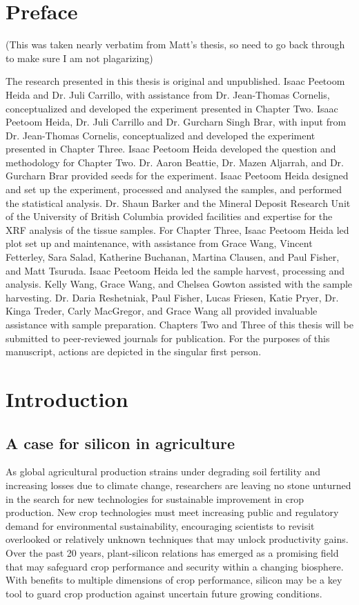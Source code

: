 \documentclass[12pt, letterpaper, ]{article}
\begin{document}
\section{Preface}

(This was taken nearly verbatim from Matt's thesis, so need to go back through to make sure I am not plagarizing)

The research presented in this thesis is original and unpublished. Isaac Peetoom Heida and Dr. Juli Carrillo, with assistance from Dr. Jean-Thomas Cornelis, conceptualized and developed the experiment presented in Chapter Two. Isaac Peetoom Heida, Dr. Juli Carrillo and Dr. Gurcharn Singh Brar, with input from Dr. Jean-Thomas Cornelis, conceptualized and developed the experiment presented in Chapter Three.
Isaac Peetoom Heida developed the question and methodology for Chapter Two. Dr. Aaron Beattie, Dr. Mazen Aljarrah, and Dr. Gurcharn Brar provided seeds for the experiment. Isaac Peetoom Heida designed and set up the experiment, processed and analysed the samples, and performed the statistical analysis. Dr. Shaun Barker and the Mineral Deposit Research Unit of the University of British Columbia provided facilities and expertise for the XRF analysis of the tissue samples.
For Chapter Three, Isaac Peetoom Heida led plot set up and maintenance, with assistance from Grace Wang, Vincent Fetterley, Sara Salad, Katherine Buchanan, Martina Clausen, and Paul Fisher, and Matt Tsuruda. Isaac Peetoom Heida led the sample harvest, processing and analysis. Kelly Wang, Grace Wang, and Chelsea Gowton assisted with the sample harvesting. Dr. Daria Reshetniak, Paul Fisher, Lucas Friesen, Katie Pryer, Dr. Kinga Treder, Carly MacGregor, and Grace Wang all provided invaluable assistance with sample preparation. 
Chapters Two and Three of this thesis will be submitted to peer-reviewed journals for publication. For the purposes of this manuscript, actions are depicted in the singular first person. 

\section{Introduction}

\subsection{A case for silicon in agriculture}

As global agricultural production strains under degrading soil fertility and increasing losses due to climate change, researchers are leaving no stone unturned in the search for new technologies for sustainable improvement in crop production. New crop technologies must meet increasing public and regulatory demand for environmental sustainability, encouraging scientists to revisit overlooked or relatively unknown techniques that may unlock productivity gains. Over the past 20 years, plant-silicon relations has emerged as a promising field that may safeguard crop performance and security within a changing biosphere. With benefits to multiple dimensions of crop performance, silicon may be a key tool to guard crop production against uncertain future growing conditions. 
\end{document}

